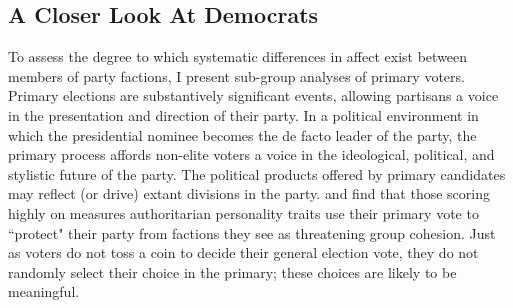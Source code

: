 \documentclass[12pt]{article}
\begin{document}



%
\subsection{A Closer Look At Democrats}

To assess the degree to which systematic differences in affect exist between members of party factions, I present sub-group analyses of primary voters. Primary elections are substantively significant events, allowing partisans a voice in the presentation and direction of their party. In a political environment in which the presidential nominee becomes the de facto leader of the party, the primary process affords non-elite voters a voice in the ideological, political, and stylistic future of the party. The political products offered by primary candidates may reflect (or drive) extant divisions in the party. \cite{wronski2018tale} and \cite{bankert2020authoritarian} find that those scoring highly on measures authoritarian personality traits use their primary vote to ``protect" their party from factions they see as threatening group cohesion. Just as voters do not toss a coin to decide their general election vote, they do not randomly select their choice in the primary; these choices are likely to be meaningful. 
\end{document}
